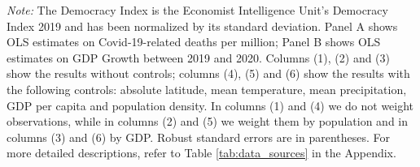 \begin{table}[!htbp]
\begin{threeparttable}
\begin{tablenotes}
    \item {\textit{Note:} The Democracy Index is the Economist Intelligence Unit's Democracy Index 2019 and has been normalized by its standard deviation. Panel A shows OLS estimates on Covid-19-related deaths per million; Panel B shows OLS estimates on GDP Growth between 2019 and 2020. Columns (1), (2) and (3) show the results without controls; columns (4), (5) and (6) show the results with the following controls: absolute latitude, mean temperature, mean precipitation, GDP per capita and population density. In columns (1) and (4) we do not weight observations, while in columns (2) and (5) we weight them by population and in  columns (3) and (6) by GDP. Robust standard errors are in parentheses. For more detailed descriptions, refer to Table \ref{tab:data_sources} in the Appendix.}
\end{tablenotes}

\end{threeparttable}
\end{table}

